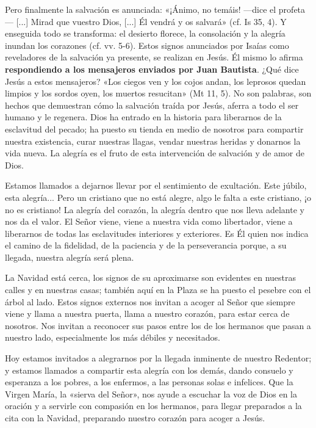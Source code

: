\documentclass[]{article}
\begin{document}
Pero finalmente la salvación es anunciada: «¡Ánimo, no temáis! ---dice
el profeta--- {[}...{]} Mirad que vuestro Dios, {[}...{]} Él vendrá y os
salvará» (cf. Is 35, 4). Y enseguida todo se transforma: el desierto
florece, la consolación y la alegría inundan los corazones (cf. vv.
5-6). Estos signos anunciados por Isaías como reveladores de la
salvación ya presente, se realizan en Jesús. Él mismo lo afirma
\textbf{respondiendo a los mensajeros enviados por Juan Bautista}. ¿Qué
dice Jesús a estos mensajeros? «Los ciegos ven y los cojos andan, los
leprosos quedan limpios y los sordos oyen, los muertos resucitan» (Mt
11, 5). No son palabras, son hechos que demuestran cómo la salvación
traída por Jesús, aferra a todo el ser humano y le regenera. Dios ha
entrado en la historia para liberarnos de la esclavitud del pecado; ha
puesto su tienda en medio de nosotros para compartir nuestra existencia,
curar nuestras llagas, vendar nuestras heridas y donarnos la vida nueva.
La alegría es el fruto de esta intervención de salvación y de amor de
Dios.

Estamos llamados a dejarnos llevar por el sentimiento de exultación.
Este júbilo, esta alegría... Pero un cristiano que no está alegre, algo
le falta a este cristiano, ¡o no es cristiano! La alegría del corazón,
la alegría dentro que nos lleva adelante y nos da el valor. El Señor
viene, viene a nuestra vida como libertador, viene a liberarnos de todas
las esclavitudes interiores y exteriores. Es Él quien nos indica el
camino de la fidelidad, de la paciencia y de la perseverancia porque, a
su llegada, nuestra alegría será plena.

La Navidad está cerca, los signos de su aproximarse son evidentes en
nuestras calles y en nuestras casas; también aquí en la Plaza se ha
puesto el pesebre con el árbol al lado. Estos signos externos nos
invitan a acoger al Señor que siempre viene y llama a nuestra puerta,
llama a nuestro corazón, para estar cerca de nosotros. Nos invitan a
reconocer sus pasos entre los de los hermanos que pasan a nuestro lado,
especialmente los más débiles y necesitados.

Hoy estamos invitados a alegrarnos por la llegada inminente de nuestro
Redentor; y estamos llamados a compartir esta alegría con los demás,
dando consuelo y esperanza a los pobres, a los enfermos, a las personas
solas e infelices. Que la Virgen María, la «sierva del Señor», nos ayude
a escuchar la voz de Dios en la oración y a servirle con compasión en
los hermanos, para llegar preparados a la cita con la Navidad,
preparando nuestro corazón para acoger a
Jesús.\protect\hypertarget{_Toc448662752}{}{\protect\hypertarget{_Toc448690271}{}{\protect\hypertarget{_Toc448708294}{}{\protect\hypertarget{_Toc448709380}{}{\protect\hypertarget{_Toc449554382}{}{}}}}}
\end{document}
